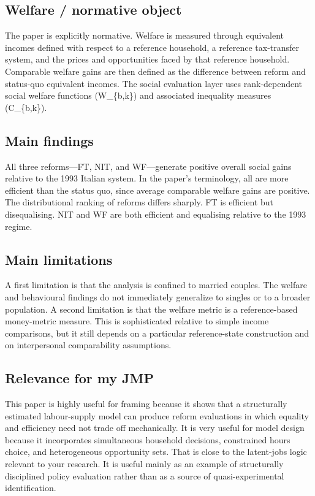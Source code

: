 \documentclass[11pt,a4paper]{article}
\begin{document}
\subsection*{Welfare / normative object}
The paper is explicitly normative. Welfare is measured through equivalent incomes defined with respect to a reference household, a reference tax-transfer system, and the prices and opportunities faced by that reference household. Comparable welfare gains are then defined as the difference between reform and status-quo equivalent incomes. The social evaluation layer uses rank-dependent social welfare functions (W\_\{b,k\}) and associated inequality measures (C\_\{b,k\}).

\subsection*{Main findings}
All three reforms—FT, NIT, and WF—generate positive overall social gains relative to the 1993 Italian system. In the paper’s terminology, all are more efficient than the status quo, since average comparable welfare gains are positive. The distributional ranking of reforms differs sharply. FT is efficient but disequalising. NIT and WF are both efficient and equalising relative to the 1993 regime.

\subsection*{Main limitations}
A first limitation is that the analysis is confined to married couples. The welfare and behavioural findings do not immediately generalize to singles or to a broader population. A second limitation is that the welfare metric is a reference-based money-metric measure. This is sophisticated relative to simple income comparisons, but it still depends on a particular reference-state construction and on interpersonal comparability assumptions.

\subsection*{Relevance for my JMP}
This paper is highly useful for framing because it shows that a structurally estimated labour-supply model can produce reform evaluations in which equality and efficiency need not trade off mechanically. It is very useful for model design because it incorporates simultaneous household decisions, constrained hours choice, and heterogeneous opportunity sets. That is close to the latent-jobs logic relevant to your research. It is useful mainly as an example of structurally disciplined policy evaluation rather than as a source of quasi-experimental identification.
\end{document}

